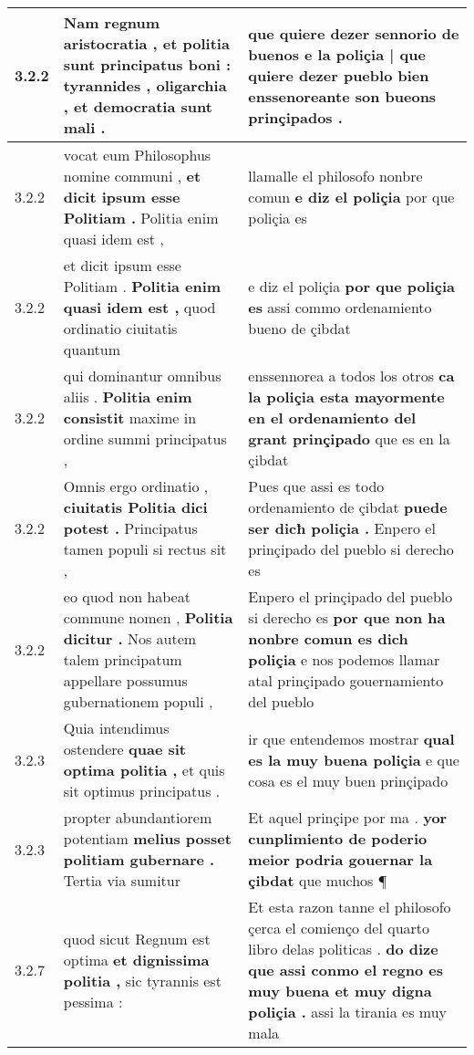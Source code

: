 \begin{tabular}{|p{1cm}|p{6.5cm}|p{6.5cm}|}
3.2.2 & Nam regnum aristocratia , \textbf{ et politia sunt principatus boni : } tyrannides , oligarchia , et democratia sunt mali . & que quiere dezer sennorio de buenos \textbf{ e la poliçia | que quiere dezer pueblo bien } enssenoreante son bueons prinçipados . \\\hline
3.2.2 & vocat eum Philosophus nomine communi , \textbf{ et dicit ipsum esse Politiam . } Politia enim quasi idem est , & llamalle el philosofo nonbre comun \textbf{ e diz el poliçia } por que poliçia es \\\hline
3.2.2 & et dicit ipsum esse Politiam . \textbf{ Politia enim quasi idem est , } quod ordinatio ciuitatis quantum & e diz el poliçia \textbf{ por que poliçia es } assi commo ordenamiento bueno de çibdat \\\hline
3.2.2 & qui dominantur omnibus aliis . \textbf{ Politia enim consistit } maxime in ordine summi principatus , & enssennorea a todos los otros \textbf{ ca la poliçia esta mayormente en el ordenamiento del grant prinçipado } que es en la çibdat \\\hline
3.2.2 & Omnis ergo ordinatio , \textbf{ ciuitatis Politia dici potest . } Principatus tamen populi si rectus sit , & Pues que assi es todo ordenamiento de çibdat \textbf{ puede ser dicħ poliçia . } Enpero el prinçipado del pueblo si derecho es \\\hline
3.2.2 & eo quod non habeat commune nomen , \textbf{ Politia dicitur . } Nos autem talem principatum appellare possumus gubernationem populi , & Enpero el prinçipado del pueblo si derecho es \textbf{ por que non ha nonbre comun es dich poliçia } e nos podemos llamar atal prinçipado gouernamiento del pueblo \\\hline
3.2.3 & Quia intendimus ostendere \textbf{ quae sit optima politia , } et quis sit optimus principatus . & ir que entendemos mostrar \textbf{ qual es la muy buena poliçia } e que cosa es el muy buen prinçipado \\\hline
3.2.3 & propter abundantiorem potentiam \textbf{ melius posset politiam gubernare . } Tertia via sumitur & Et aquel prinçipe por ma . \textbf{ yor cunplimiento de poderio meior podria gouernar la çibdat } que muchos ¶ \\\hline
3.2.7 & quod sicut Regnum est optima \textbf{ et dignissima politia , } sic tyrannis est pessima : & Et esta razon tanne el philosofo çerca el comienço del quarto libro delas politicas . \textbf{ do dize que assi conmo el regno es muy buena et muy digna poliçia . } assi la tirania es muy mala \\\hline

\end{tabular}
